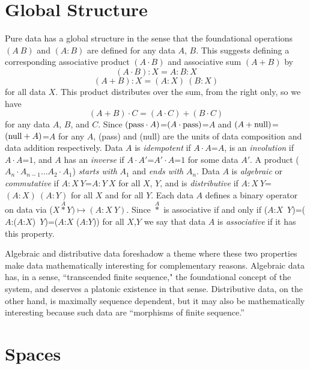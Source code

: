 \documentclass[11pt]{article}
\begin{document}
\section{Global Structure} 

    Pure data has a global structure in the sense that the foundational operations $(A\ B)$ and $(A:B)$ are defined for any data $A$, $B$.  
This suggests defining a corresponding associative product $(A\cdot B)$ and associative sum $(A+B)$ by    
\begin{equation}
(A \cdot B):X = A:B:X 
\end{equation}
\begin{equation}
(A+B):X = (A:X)\ (B:X) 
\end{equation}
for all data $X$. This product distributes over the sum, from the right only, so we have 
\begin{equation}
(A+B)\cdot C=(A\cdot C)+(B\cdot C) 
\end{equation}
for any data $A$, $B$, and $C$.
Since $({\rm pass}\cdot A)$=$(A\cdot {\rm pass})$=$A$ and $(A+{\rm null})$=$({\rm null}+A)$=$A$ for any $A$, (pass) and (null) are the units of data composition and 
data addition respectively.  
Data $A$ is {\it idempotent} if $A\cdot A$=$A$, is an {\it involution} if $A\cdot A$=$1$, and $A$ has an {\it inverse} if $A\cdot A'$=$A'\cdot A$=$1$ for some data $A'$.   
A product ($A_n\cdot A_{n-1}\dots A_2\cdot A_1$) {\it starts with} $A_1$ and {\it ends with} $A_n$.   
Data $A$ is {\it algebraic} or {\it commutative} if $A:X\ Y$=$A:Y\ X$ for all $X$, $Y$, and is 
{\it distributive} if $A:X\ Y$=$(A:X)\ (A:Y)$ for all $X$ and for all $Y$.  
Each data $A$ defines a binary operator on data via ($X{\overset A\ast}Y)\mapsto (A:X\ Y)$.  Since ${\overset A\ast}$ is associative if and only if 
 ($A$:$X$\ $Y$)=($A$:($A$:$X$)\ $Y$)=($A$:$X$ ($A$:$Y$)) for all $X$,$Y$ we say that data $A$ is {\it associative} if it has this property.  
 
Algebraic and distributive data foreshadow a theme where these two properties make data mathematically interesting for complementary reasons.  
Algebraic data has, in a sense, ``transcended finite sequence," the foundational concept of the system, and deserves a platonic existence in 
that sense.  Distributive data, on the other hand, is maximally sequence dependent, but it may also be mathematically interesting because  
such data are ``morphisms of finite sequence.''   
 
\section{Spaces}
\end{document}
